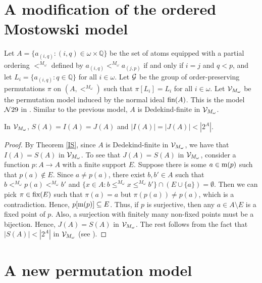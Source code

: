 \section{A modification of the ordered Mostowski model}

Let $A=\{a_{(i,q)}:(i,q)\in \omega\times\mathbb{Q}\}$ be the set of atoms equipped with a partial ordering $<^{M_{\omega}}$ defined by $a_{(i,q)}<^{M_{\omega}}a_{(j,p)}$ if and only if $i=j$ and $q<p$, and let $L_{i}=\{a_{(i,q)}:q\in\mathbb{Q}\}$ for all $i\in\omega$. Let $\mathcal{G}$ be the group of order-preserving permutations $\pi$ on $(A,<^{M_{\omega}})$ such that $\pi[L_{i}]=L_{i}$ for all $i\in\omega$. Let $\mathcal{V}_{M_\omega}$ be the permutation model induced by the normal ideal $\textup{fin}(A)$. This is the model $\mathcal{N}29$ in \cite{HowardRubin}. Similar to the previous model, $A$ is Dedekind-finite in $\mathcal{V}_{M_{\omega}}$.

\begin{theorem}\label{VinfM} 
In $\mathcal{V}_{M_{\omega}}$, $S(A)=I(A)=J(A)$ and $|I(A)|=|J(A)|<|2^{A}|$.  
\end{theorem}

\begin{proof}
By Theorem \ref{IS}, since $A$ is Dedekind-finite in $\mathcal{V}_{M_{\omega}}$, we have that $I(A)=S(A)$ in $\mathcal{V}_{M_{\omega}}$. To see that $J(A)=S(A)$ in $\mathcal{V}_{M_{\omega}}$, consider a function $p:A\to A$ with a finite support $E$. Suppose there is some $a\in \textup{m}(p)$ such that $p(a)\notin E$. Since $a\neq p(a)$, there exist $b,b'\in A$ such that $b<^{M_{\omega}}p(a)<^{M_{\omega}}b'$ and $\{x\in A: b\leq^{M_{\omega}} x\leq^{M_{\omega}} b'\}\cap (E\cup\{a\})=\emptyset$. Then we can pick $\pi\in \textup{fix}(E)$ such that $\pi(a)=a$ but $\pi(p(a))\neq p(a)$, which is a contradiction. Hence, $p[\textup{m}(p)]\subseteq E$. Thus, if $p$ is surjective, then any $a\in A\setminus E$ is a fixed point of $p$. Also, a surjection with finitely many non-fixed points must be a bijection. Hence, $J(A)=S(A)$ in $\mathcal{V}_{M_{\omega}}$. The rest follows from the fact that $|S(A)|<|2^{A}|$ in $\mathcal{V}_{M_{\omega}}$ (see \cite[Theorem 2.25]{DH}).
\end{proof}





\section{A new permutation model}

